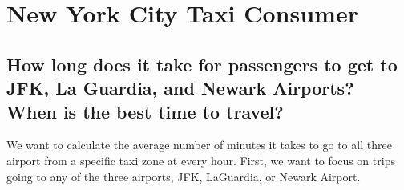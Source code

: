 \documentclass[12pt,twoside]{reedthesis}
\newenvironment{Shaded}{\begin{snugshade}}{\end{snugshade}}
\newcommand{\KeywordTok}[1]{\textcolor[rgb]{0.13,0.29,0.53}{\textbf{#1}}}
\newcommand{\DataTypeTok}[1]{\textcolor[rgb]{0.13,0.29,0.53}{#1}}
\newcommand{\DecValTok}[1]{\textcolor[rgb]{0.00,0.00,0.81}{#1}}
\newcommand{\FloatTok}[1]{\textcolor[rgb]{0.00,0.00,0.81}{#1}}
\newcommand{\StringTok}[1]{\textcolor[rgb]{0.31,0.60,0.02}{#1}}
\newcommand{\CommentTok}[1]{\textcolor[rgb]{0.56,0.35,0.01}{\textit{#1}}}
\newcommand{\OperatorTok}[1]{\textcolor[rgb]{0.81,0.36,0.00}{\textbf{#1}}}
\newcommand{\NormalTok}[1]{#1}
\theoremstyle{definition}
\theoremstyle{definition}
\theoremstyle{definition}
\theoremstyle{remark}
\begin{document}
\chapter{New York City Taxi Consumer}\label{chapter4}

\section{How long does it take for passengers to get to JFK, La Guardia,
and Newark Airports? When is the best time to
travel?}\label{how-long-does-it-take-for-passengers-to-get-to-jfk-la-guardia-and-newark-airports-when-is-the-best-time-to-travel}

We want to calculate the average number of minutes it takes to go to all
three airport from a specific taxi zone at every hour. First, we want to
focus on trips going to any of the three airports, JFK, LaGuardia, or
Newark Airport.
\begin{Shaded}
\end{Shaded}
\end{document}
